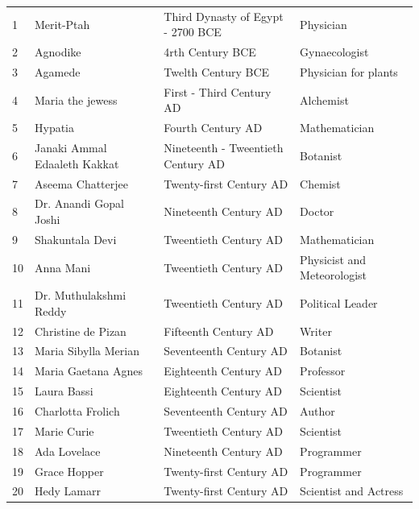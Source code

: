 \documentclass[a4paper,10pt]{article}
\begin{document}
\begin{center}
\begin{table}[h]
\begin{tabular}{|l|l|l|l|}
  1 & Merit-Ptah & Third Dynasty of Egypt - 2700 BCE & Physician\\
  2 & Agnodike & 4rth Century BCE & Gynaecologist\\
  3 & Agamede & Twelth Century BCE & Physician for plants\\
  4 & Maria the jewess & First - Third Century AD & Alchemist\\
  5 & Hypatia & Fourth Century AD & Mathematician\\
  6 & Janaki Ammal Edaaleth Kakkat & Nineteenth - Tweentieth Century AD & Botanist\\
  7 & Aseema Chatterjee & Twenty-first Century AD & Chemist\\
  8 & Dr. Anandi Gopal Joshi & Nineteenth Century AD & Doctor\\
  9 & Shakuntala Devi & Tweentieth Century AD & Mathematician\\
  10 & Anna Mani & Tweentieth Century AD & Physicist and Meteorologist\\
  11 & Dr. Muthulakshmi Reddy & Tweentieth Century AD & Political Leader\\
  12 & Christine de Pizan & Fifteenth Century AD & Writer\\
  13 & Maria Sibylla Merian & Seventeenth Century AD & Botanist\\
  14 & Maria Gaetana Agnes & Eighteenth Century AD & Professor\\
  15 & Laura Bassi & Eighteenth Century AD & Scientist\\
  16 & Charlotta Frolich & Seventeenth Century AD & Author\\
  17 & Marie Curie & Tweentieth Century AD & Scientist \\
  18 & Ada Lovelace & Nineteenth Century AD & Programmer\\
  19 & Grace Hopper & Twenty-first Century AD & Programmer\\
  20 & Hedy Lamarr & Twenty-first Century AD& Scientist and Actress\\
\hline\hline  
 \end{tabular}

\end{table}


\end{center}
\end{document}
